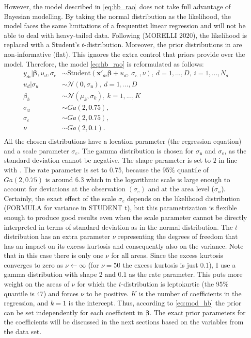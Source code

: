 However, the model described in \ref{eq:hb_rao} does not take full advantage of Bayesian modelling.
By taking the normal distribution as the likelihood, the model faces the same limitations of a frequentist linear regression and will not be able to deal with heavy-tailed data.
Following (MORELLI 2020), the likelihood is replaced with a Student's $t$-distribution.
Moreover, the prior distributions in \cite{molina_small_2014} are non-informative (flat).
This ignores the extra control that priors provide over the model. Therefore, the model \ref{eq:hb_rao} is reformulated as follows:
\begin{equation}
	\begin{split}
		y_{di} |\boldsymbol \beta, u_d, \sigma_e & \sim
            \text{Student}(\boldsymbol{x'}_{di} \boldsymbol \beta + u_d,\ \sigma_e\ , \nu),\ d = 1, ..., D,\ i = 1, ..., N_d \\
		u_d | \sigma_u & \sim \mathcal N(0, \sigma_u),\ d = 1, ..., D \\
		\beta_k & \sim \mathcal N(\mu_k, \sigma_k),\ k = 1, ..., K\\
		\sigma_u & \sim Ga(2, 0.75), \\
		\sigma_e & \sim Ga(2, 0.75), \\
		\nu & \sim Ga(2, 0.1). \\
	\end{split}
	\label{eq:mod_hb}
\end{equation}
All the chosen distributions have a location parameter (the regression equation) and a scale parameter $\sigma_e$. The gamma distribution is chosen for $\sigma_u$ and $\sigma_e$, as the standard deviation cannot be negative.
The shape parameter is set to 2 in line with \cite{gelman_prior_2020}.
The rate parameter is set to 0.75, because the 95\% quantile of $Ga(2, 0.75)$ is around 6.3 which in the logarithmic scale is large enough to account for deviations at the observation $(\sigma_e)$ and at the area level ($\sigma_u$).
Certainly, the exact effect of the scale $\sigma_e$ depends on the likelihood distribution (FORMULA for variance in STUDENT t), but this parametrization is flexible enough to produce good results even when the scale parameter cannot be directly interpreted in terms of standard deviation as in the normal distribution.
The $t$-distribution has an extra parameter $\nu$ representing the degrees of freedom that has an impact on its excess kurtosis and consequently also on the variance.
Note that in this case there is only one $\nu$ for all areas.
Since the excess kurtosis converges to zero as $\nu \leftarrow \infty$  (for $\nu=50$ the excess kurtosis is just 0.1), I use a gamma distribution with shape 2 and $0.1$ as the rate parameter.
This puts more weight on the areas of $\nu$ for which the $t$-distribution is leptokurtic (the 95\% quantile is 47) and forces $\nu$ to be positive.
$K$ is the number of coefficients in the regression, and $k = 1$ is the intercept.
Thus, according to \ref{eq:mod_hb} the prior can be set independently for each coefficient in $\boldsymbol \beta$.
The exact prior parameters for the coefficients will be discussed in the next sections based on the variables from the data set.


